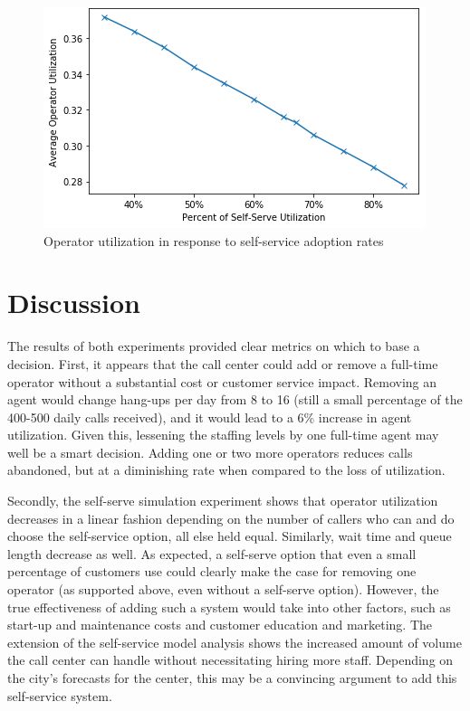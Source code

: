 \documentclass[12pt]{article}
\begin{document}
\begin{figure}[h]
	\includegraphics[scale=.5]{op_self_serve.png}
	\caption{Operator utilization in response to self-service adoption rates}
\end{figure}



\section{Discussion}

The results of both experiments provided clear metrics on which to base a decision.  First, it appears that the call center could add or remove a full-time operator without a substantial cost or customer service impact.  Removing an agent would change hang-ups per day from 8 to 16 (still a small percentage of the 400-500 daily calls received), and it would lead to a 6\% increase in agent utilization.  Given this, lessening the staffing levels by one full-time agent may well be a smart decision.  Adding one or two more operators reduces calls abandoned, but at a diminishing rate when compared to the loss of utilization.

\par

Secondly, the self-serve simulation experiment shows that operator utilization decreases in a linear fashion depending on the number of callers who can and do choose the self-service option, all else held equal.  Similarly, wait time and queue length decrease as well.  As expected, a self-serve option that even a small percentage of customers use could clearly make the case for removing one operator (as supported above, even without a self-serve option).  However, the true effectiveness of adding such a system would take into other factors, such as start-up and maintenance costs and customer education and marketing.  The extension of the self-service model analysis shows the increased amount of volume the call center can handle without necessitating hiring more staff.  Depending on the city's forecasts for the center, this may be a convincing argument to add this self-service system.
\end{document}
